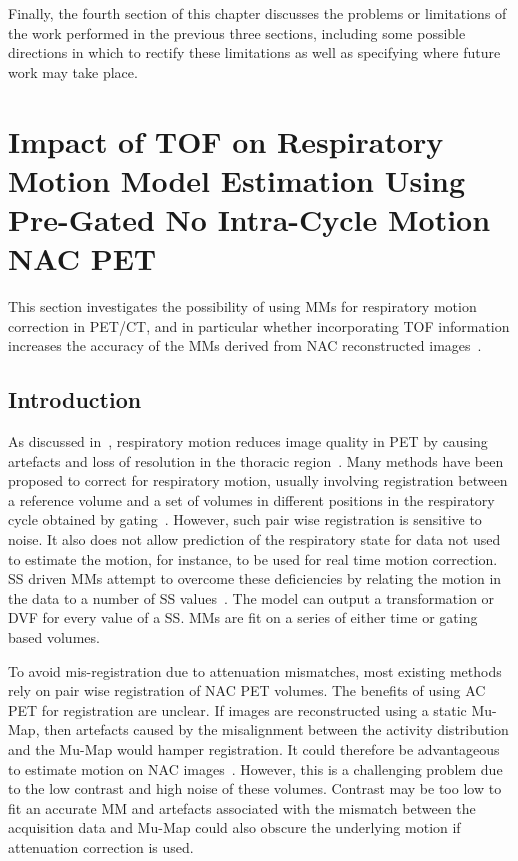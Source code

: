         Finally, the fourth section of this chapter discusses the problems or limitations of the work performed in the previous three sections, including some possible directions in which to rectify these limitations as well as specifying where future work may take place.
    
    
    \section{Impact of TOF on Respiratory Motion Model Estimation Using Pre-Gated No Intra-Cycle Motion NAC PET} \label{sec:impact_of_tof_on_respiratory_motion_model_estimation_using_pre_gated_no_intra_cycle_motion_nac_pet}
        This section investigates the possibility of using \glspl{MM} for respiratory motion correction in \gls{PET}/\gls{CT}, and in particular whether incorporating \gls{TOF} information increases the accuracy of the \glspl{MM} derived from \gls{NAC} reconstructed images~\parencite{Whitehead2019ImpactPET}.
        
        \subsection{Introduction} \label{sec:impact_of_tof_on_respiratory_motion_model_estimation_using_pre_gated_no_intra_cycle_motion_nac_pet_introduction}
        As discussed in~, respiratory motion reduces image quality in \gls{PET} by causing artefacts and loss of resolution in the thoracic region~\parencite{Nehmeh2008a}. Many methods have been proposed to correct for respiratory motion, usually involving registration between a reference volume and a set of volumes in different positions in the respiratory cycle obtained by gating~\parencite{Oliveira2014}. However, such pair wise registration is sensitive to noise. It also does not allow prediction of the respiratory state for data not used to estimate the motion, for instance, to be used for real time motion correction. \gls{SS} driven \glspl{MM} attempt to overcome these deficiencies by relating the motion in the data to a number of \gls{SS} values~\parencite{McClelland2013}. The model can output a transformation or \gls{DVF} for every value of a \gls{SS}. \glspl{MM} are fit on a series of either time or gating based volumes.

        To avoid mis-registration due to attenuation mismatches, most existing methods rely on pair wise registration of \gls{NAC} \gls{PET} volumes. The benefits of using \gls{AC} \gls{PET} for registration are unclear. If images are reconstructed using a static \gls{Mu-Map}, then artefacts caused by the misalignment between the activity distribution and the \gls{Mu-Map} would hamper registration. It could therefore be advantageous to estimate motion on \gls{NAC} images~\parencite{LungMotionDiaphragmBaiBib, Kalantari2017AttenuationRegistration:, Dawood2008RespiratoryAlgorithms, Dawood2006LungImages}. However, this is a challenging problem due to the low contrast and high noise of these volumes. Contrast may be too low to fit an accurate \gls{MM} and artefacts associated with the mismatch between the acquisition data and \gls{Mu-Map} could also obscure the underlying motion if attenuation correction is used.
        
